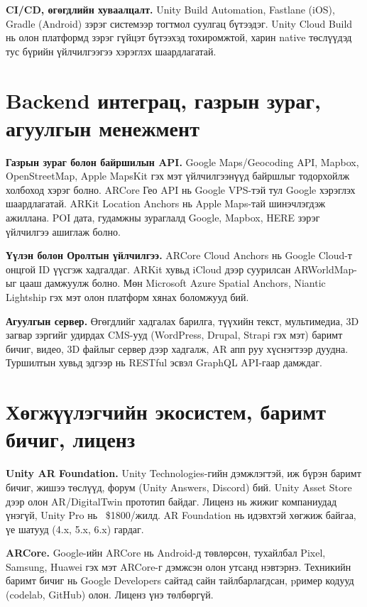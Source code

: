 \begin{sloppy}
\textbf{CI/CD, өгөгдлийн хуваалцалт.} Unity Build Automation, Fastlane (iOS), Gradle (Android) зэрэг системээр тогтмол суулгац бүтээдэг. Unity Cloud Build нь олон платформд зэрэг гүйцэт бүтээхэд тохиромжтой, харин native төслүүдэд тус бүрийн үйлчилгээгээ хэрэглэх шаардлагатай.

\section*{Backend интеграц, газрын зураг, агуулгын менежмент}

\textbf{Газрын зураг болон байршилын API.} Google Maps/Geocoding API, Mapbox, OpenStreetMap, Apple MapsKit гэх мэт үйлчилгээнүүд байршлыг тодорхойлж холбоход хэрэг болно. ARCore Гео API нь Google VPS-тэй тул Google хэрэглэх шаардлагатай. ARKit Location Anchors нь Apple Maps-тай шинэчлэгдэж ажиллана. POI дата, гудамжны зураглалд Google, Mapbox, HERE зэрэг үйлчилгээ ашиглаж болно.

\textbf{Үүлэн болон Оролтын үйлчилгээ.} ARCore Cloud Anchors нь Google Cloud-т онцгой ID үүсгэж хадгалдаг. ARKit хувьд iCloud дээр суурилсан ARWorldMap-ыг цааш дамжуулж болно. Мөн Microsoft Azure Spatial Anchors, Niantic Lightship гэх мэт олон платформ хянах боломжууд бий.

\textbf{Агуулгын сервер.} Өгөгдлийг хадгалах барилга, түүхийн текст, мультимедиа, 3D загвар зэргийг удирдах CMS-ууд (WordPress, Drupal, Strapi гэх мэт) баримт бичиг, видео, 3D файлыг сервер дээр хадгалж, AR апп руу хүснэгтээр дуудна. Туршилтын хувьд эдгээр нь RESTful эсвэл GraphQL API-гаар дамждаг.

\section*{Хөгжүүлэгчийн экосистем, баримт бичиг, лиценз}

\textbf{Unity AR Foundation.} Unity Technologies-гийн дэмжлэгтэй, иж бүрэн баримт бичиг, жишээ төслүүд, форум (Unity Answers, Discord) бий. Unity Asset Store дээр олон AR/DigitalTwin прототип байдаг. Лиценз нь жижиг компаниудад үнэгүй, Unity Pro нь ~\$1800/жилд. AR Foundation нь идэвхтэй хөгжиж байгаа, үе шатууд (4.x, 5.x, 6.x) гардаг.

\textbf{ARCore.} Google-ийн ARCore нь Android-д төвлөрсөн, тухайлбал Pixel, Samsung, Huawei гэх мэт ARCore-г дэмжсэн олон утсанд нэвтэрнэ. Техникийн баримт бичиг нь Google Developers сайтад сайн тайлбарлагдсан, pример кодууд (codelab, GitHub) олон. Лиценз үнэ төлбөргүй.


\end{sloppy}
